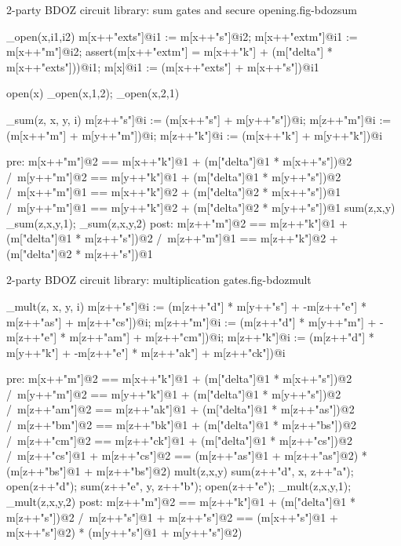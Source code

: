\begin{fpfig}[t]{2-party BDOZ circuit library: sum gates and secure opening.}{fig-bdozsum}
{\footnotesize
\begin{verbatimtab}
  _open(x,i1,i2){
     m[x++"exts"]@i1 := m[x++"s"]@i2;
     m[x++"extm"]@i1 := m[x++"m"]@i2;
     assert(m[x++"extm"] = m[x++"k"] + (m["delta"] * m[x++"exts"]))@i1;
     m[x]@i1 := (m[x++"exts"] + m[x++"s"])@i1
  }

  open(x) { _open(x,1,2); _open(x,2,1) }
   
  _sum(z, x, y, i){
     m[z++"s"]@i := (m[x++"s"] + m[y++"s"])@i;
     m[z++"m"]@i := (m[x++"m"] + m[y++"m"])@i;
     m[z++"k"]@i := (m[x++"k"] + m[y++"k"])@i
  }

  pre: { m[x++"m"]@2 == m[x++"k"]@1 + (m["delta"]@1 * m[x++"s"])@2 /\
         m[y++"m"]@2 == m[y++"k"]@1 + (m["delta"]@1 * m[y++"s"])@2 /\
         m[x++"m"]@1 == m[x++"k"]@2 + (m["delta"]@2 * m[x++"s"])@1 /\
         m[y++"m"]@1 == m[y++"k"]@2 + (m["delta"]@2 * m[y++"s"])@1 }
  sum(z,x,y){ _sum(z,x,y,1); _sum(z,x,y,2) }
  post: { m[z++"m"]@2 == m[z++"k"]@1 + (m["delta"]@1 * m[z++"s"])@2 /\
          m[z++"m"]@1 == m[z++"k"]@2 + (m["delta"]@2 * m[z++"s"])@1 } 
\end{verbatimtab}
}
\end{fpfig}

\begin{fpfig}[t]{2-party BDOZ circuit library: multiplication gates.}{fig-bdozmult}
{\footnotesize
\begin{verbatimtab}
  _mult(z, x, y, i) {
      m[z++"s"]@i :=
        (m[z++"d"] * m[y++"s"] + -m[z++"e"] * m[z++"as"] + m[z++"cs"])@i;
      m[z++"m"]@i :=
        (m[z++"d"] * m[y++"m"] + -m[z++"e"] * m[z++"am"] + m[z++"cm"])@i;
      m[z++"k"]@i :=
        (m[z++"d"] * m[y++"k"] + -m[z++"e"] * m[z++"ak"] + m[z++"ck"])@i
  }
  
  pre: { m[x++"m"]@2 == m[x++"k"]@1 + (m["delta"]@1 * m[x++"s"])@2 /\
         m[y++"m"]@2 == m[y++"k"]@1 + (m["delta"]@1 * m[y++"s"])@2 /\
         m[z++"am"]@2 == m[z++"ak"]@1 + (m["delta"]@1 * m[z++"as"])@2 /\
         m[z++"bm"]@2 == m[z++"bk"]@1 + (m["delta"]@1 * m[z++"bs"])@2 /\
         m[z++"cm"]@2 == m[z++"ck"]@1 + (m["delta"]@1 * m[z++"cs"])@2 /\
         m[z++"cs"]@1 + m[z++"cs"]@2 ==
            (m[z++"as"]@1 + m[z++"as"]@2) * (m[z++"bs"]@1 + m[z++"bs"]@2)}
  mult(z,x,y) {
      sum(z++"d", x, z++"a");
      open(z++"d");
      sum(z++"e", y, z++"b");
      open(z++"e"); 
      _mult(z,x,y,1); _mult(z,x,y,2)
  }
  post: {  m[z++"m"]@2 == m[z++"k"]@1 + (m["delta"]@1 * m[z++"s"])@2 /\
           m[z++"s"]@1 + m[z++"s"]@2 ==
              (m[x++"s"]@1 + m[x++"s"]@2) * (m[y++"s"]@1 + m[y++"s"]@2) } 
  
\end{verbatimtab}
}
\end{fpfig}

